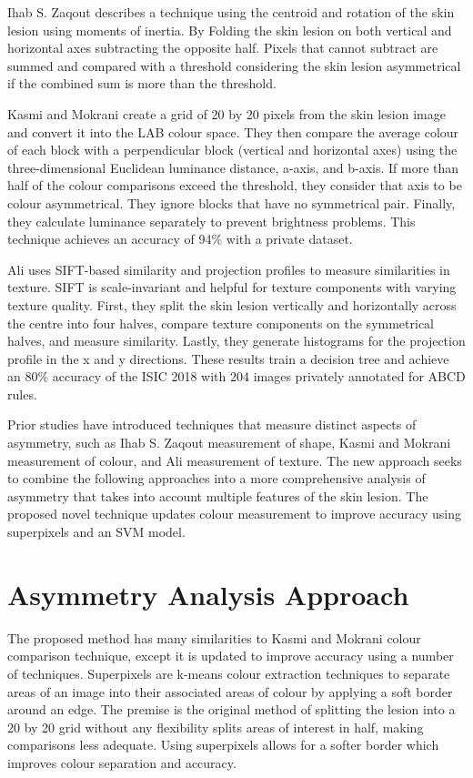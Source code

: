 Ihab S. Zaqout \cite{Zaqout2016} describes a technique using the centroid and rotation of the skin lesion using moments of inertia. By Folding the skin lesion on both vertical and horizontal axes subtracting the opposite half. Pixels that cannot subtract are summed and compared with a threshold considering the skin lesion asymmetrical if the combined sum is more than the threshold.

Kasmi and Mokrani \cite{Kasmi2016a} create a grid of 20 by 20 pixels from the skin lesion image and convert it into the LAB colour space. They then compare the average colour of each block with a perpendicular block (vertical and horizontal axes) using the three-dimensional Euclidean luminance distance, a-axis, and b-axis. If more than half of the colour comparisons exceed the threshold, they consider that axis to be colour asymmetrical. They ignore blocks that have no symmetrical pair. Finally, they calculate luminance separately to prevent brightness problems. This technique achieves an accuracy of 94\% with a private dataset.

Ali \cite{Ali2020a} uses SIFT-based similarity and projection profiles to measure similarities in texture. SIFT is scale-invariant and helpful for texture components with varying texture quality. First, they split the skin lesion vertically and horizontally across the centre into four halves, compare texture components on the symmetrical halves, and measure similarity. Lastly, they generate histograms for the projection profile in the x and y directions. These results train a decision tree and achieve an 80\% accuracy of the ISIC 2018 with 204 images privately annotated for ABCD rules.

Prior studies have introduced techniques that measure distinct aspects of asymmetry, such as Ihab S. Zaqout \cite{Zaqout2016} measurement of shape, Kasmi and Mokrani \cite{Kasmi2016a} measurement of colour, and  Ali \cite{Ali2020a} measurement of texture. The new approach seeks to combine the following approaches into a more comprehensive analysis of asymmetry that takes into account multiple features of the skin lesion. The proposed novel technique updates colour measurement to improve accuracy using superpixels and an SVM model.

\section{Asymmetry Analysis Approach}
The proposed method has many similarities to Kasmi and Mokrani \cite{Kasmi2016a} colour comparison technique, except it is updated to improve accuracy using a number of techniques. Superpixels are k-means colour extraction techniques to separate areas of an image into their associated areas of colour by applying a soft border around an edge. The premise is the original method of splitting the lesion into a 20 by 20 grid without any flexibility splits areas of interest in half, making comparisons less adequate. Using superpixels allows for a softer border which improves colour separation and accuracy.

